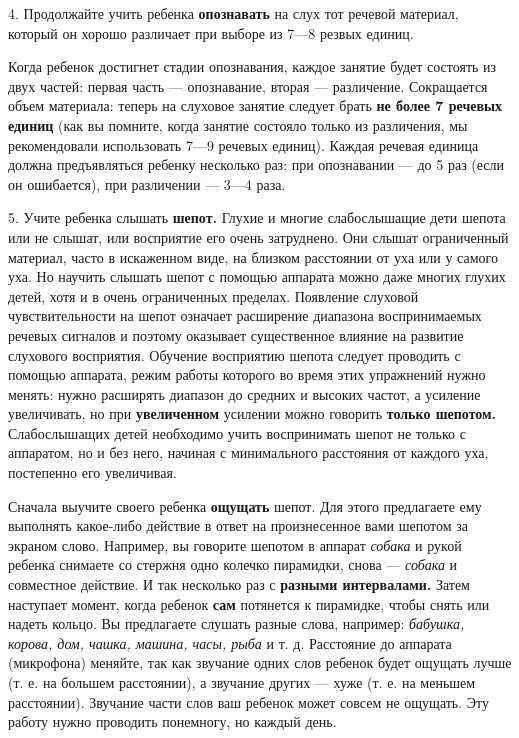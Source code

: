 \documentclass{book}
\renewcommand{\emph}[1]{\textit{#1}}
\begin{document}
4. Продолжайте учить ребенка \textbf{опознавать} на слух тот речевой
материал, который он хорошо различает при выборе из 7---8 резвых единиц.

Когда ребенок достигнет стадии опознавания, каждое занятие будет
состоять из двух частей: первая часть --- опознавание, вторая ---
различение. Сокращается объем материала: теперь на слуховое занятие
следует брать \textbf{не более 7 речевых единиц} (как вы помните, когда
занятие состояло только из различения, мы рекомендовали использовать
7---9 речевых единиц). Каждая речевая единица должна предъявляться
ребенку несколько раз: при опознавании --- до 5 раз (если он ошибается),
при различении --- 3---4 раза.

5. Учите ребенка слышать \textbf{шепот.} Глухие и многие слабослышащие
дети шепота или не слышат, или восприятие его очень затруднено. Они
слышат ограниченный материал, часто в искаженном виде, на близком
расстоянии от уха или у самого уха. Но научить слышать шепот с помощью
аппарата можно даже многих глухих детей, хотя и в очень ограниченных
пределах. Появление слуховой чувствительности на шепот означает
расширение диапазона воспринимаемых речевых сигналов и поэтому оказывает
существенное влияние на развитие слухового восприятия. Обучение
восприятию шепота следует проводить с помощью аппарата, режим работы
которого во время этих упражнений нужно менять: нужно расширять диапазон
до средних и высоких частот, а усиление увеличивать, но при
\textbf{увеличенном} усилении можно говорить \textbf{только шепотом.}
Слабослышащих детей необходимо учить воспринимать шепот не только с
аппаратом, но и без него, начиная с минимального расстояния от каждого
уха, постепенно его увеличивая.

Сначала выучите своего ребенка \textbf{ощущать} шепот. Для этого
предлагаете ему выполнять какое-либо действие в ответ на произнесенное
вами шепотом за экраном слово. Например, вы говорите шепотом в аппарат
\emph{собака} и рукой ребенка снимаете со стержня одно колечко
пирамидки, снова --- \emph{собака} и совместное действие. И так
несколько раз с \textbf{разными интервалами.} Затем наступает момент,
когда ребенок \textbf{сам} потянется к пирамидке, чтобы снять или надеть
кольцо. Вы предлагаете слушать разные слова, например: \emph{бабушка,
корова, дом, чашка, машина, часы, рыба} и т. д. Расстояние до аппарата
(микрофона) меняйте, так как звучание одних слов ребенок будет ощущать
лучше (т. е. на большем расстоянии), а звучание других --- хуже (т. е.
на меньшем расстоянии). Звучание части слов ваш ребенок может совсем не
ощущать. Эту работу нужно проводить понемногу, но каждый день.
\end{document}

